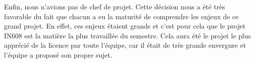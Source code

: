 \documentclass[11pt]{article}
\begin{document}
Enfin, nous n'avions pas de chef de projet. Cette décision nous a été très
favorable du fait que chacun a eu la maturité de comprendre les enjeux de ce
grand projet. En effet, ces enjeux étaient grands et c'est pour cela que le
projet IN608 est la matière la plus travaillée du semestre. Cela aura été le
projet le plus apprécié de la licence par toute l'équipe, car il était de très
grande envergure et l'équipe a proposé son propre sujet. 
\end{document}
